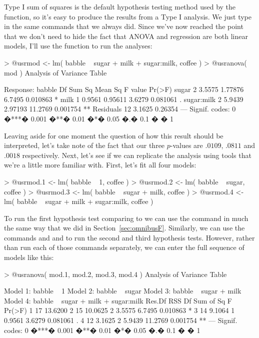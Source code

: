 Type I sum of squares is the default hypothesis testing method used by the  function, so it's easy to produce the results from a Type I analysis. We just type in the same commands that we always did. Since we've now reached the point that we don't need to hide the fact that ANOVA and regression are both linear models, I'll use the  function to run the analyses:
\begin{rblock1}
> @usr{mod <- lm( babble ~ sugar + milk + sugar:milk, coffee )}
> @usr{anova( mod )}
Analysis of Variance Table

Response: babble
           Df Sum Sq Mean Sq F value   Pr(>F)   
sugar       2 3.5575 1.77876  6.7495 0.010863 * 
milk        1 0.9561 0.95611  3.6279 0.081061 . 
sugar:milk  2 5.9439 2.97193 11.2769 0.001754 **
Residuals  12 3.1625 0.26354                    
---
Signif. codes:  0 �***� 0.001 �**� 0.01 �*� 0.05 �.� 0.1 � � 1 
\end{rblock1}
Leaving aside for one moment the question of how this result should be interpreted, let's take note of the fact that our three $p$-values are $.0109$, $.0811$ and $.0018$ respectively. Next, let's see if we can replicate the analysis using tools that we're a little more familiar with. First, let's fit all four models:
\begin{rblock1}
> @usr{mod.1 <- lm( babble ~ 1, coffee )}
> @usr{mod.2 <- lm( babble ~ sugar, coffee )}
> @usr{mod.3 <- lm( babble ~ sugar + milk, coffee )}
> @usr{mod.4 <- lm( babble ~ sugar + milk + sugar:milk, coffee )}
\end{rblock1}
To run the first hypothesis test comparing  to  we can use the command  in much the same way that we did in Section~\ref{sec:omnibusF}. Similarly, we can use the commands  and  and to run the second and third hypothesis tests. However, rather than run each of those commands separately, we can  enter the full sequence of models like this:
\begin{rblock1}
> @usr{anova( mod.1, mod.2, mod.3, mod.4 )}
Analysis of Variance Table

Model 1: babble ~ 1
Model 2: babble ~ sugar
Model 3: babble ~ sugar + milk
Model 4: babble ~ sugar + milk + sugar:milk
  Res.Df     RSS Df Sum of Sq       F   Pr(>F)   
1     17 13.6200                                 
2     15 10.0625  2    3.5575  6.7495 0.010863 * 
3     14  9.1064  1    0.9561  3.6279 0.081061 . 
4     12  3.1625  2    5.9439 11.2769 0.001754 **
---
Signif. codes:  0 �***� 0.001 �**� 0.01 �*� 0.05 �.� 0.1 � � 1 
\end{rblock1}
